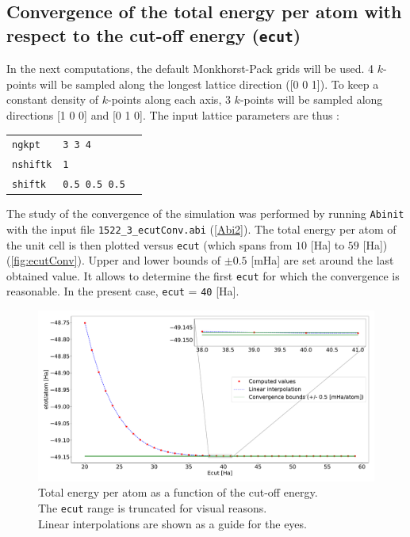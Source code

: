 \documentclass[11pt,a4paper]{article}
\begin{document}
\subsection{Convergence of the total energy per atom with respect to the cut-off energy (\texttt{ecut})}
In the next computations, the default Monkhorst-Pack grids will be used. 4 $k$-points will be sampled along the longest lattice direction ([0 0 1]). To keep a constant density of $k$-points along each axis, 3 $k$-points will be sampled along directions [1 0 0] and  [0 1 0]. The input lattice parameters are thus :
\begin{center}
\begin{tabular}{lll}
\texttt{ngkpt} & \texttt{3 3 4}&\\
\texttt{nshiftk} & \texttt{1} &\\
\texttt{shiftk} &\texttt{0.5 0.5 0.5}
\end{tabular}
\end{center}
The study of the convergence of the simulation was performed by running \texttt{Abinit} with the input file \texttt{1522\_3\_ecutConv.abi} (\autoref{Abi2}).
The total energy per atom of the unit cell is then plotted versus \texttt{ecut} (which spans from $10$ [Ha] to $59$ [Ha]) (\autoref{fig:ecutConv}). Upper and lower bounds of $\pm 0.5$ [mHa] are set around the last obtained value. It allows to determine the first \texttt{ecut} for which the convergence is reasonable. In the present case, \texttt{ecut} = \texttt{40} [Ha].
\begin{figure}[H]
\includegraphics[width=\textwidth]{images/etotecut}
\caption{Total energy per atom as a function of the cut-off energy.\\
The \texttt{ecut} range is truncated for visual reasons.\\
Linear interpolations are shown as a guide for the eyes.}
\label{fig:ecutConv}
\end{figure}
\end{document}
